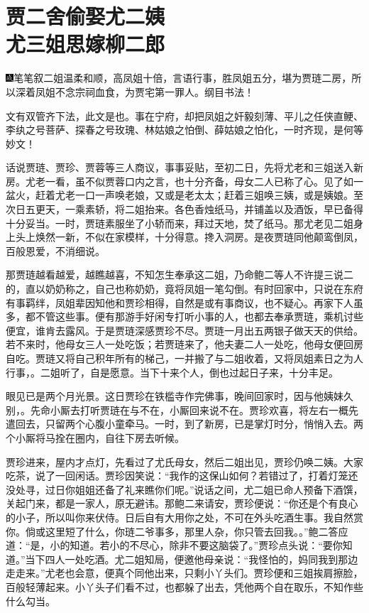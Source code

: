 
\chapter{贾二舍偷娶尤二姨\\尤三姐思嫁柳二郎}
{\includegraphics[width=3mm]{../Images/00005}\kaishu 笔笔叙二姐温柔和顺，高凤姐十倍，言语行事，胜凤姐五分，堪为贾琏二房，所以深着凤姐不念宗祠血食，为贾宅第一罪人。纲目书法！}

{\kaishu 文有双管齐下法，此文是也。事在宁府，却把凤姐之奸毅刻薄、平儿之任侠直鲠、李纨之号菩萨、探春之号玫瑰、林姑娘之怕倒、薛姑娘之怕化，一时齐现，是何等妙文！}

话说贾琏、贾珍、贾蓉等三人商议，事事妥贴，至初二日，先将尤老和三姐送入新房。尤老一看，虽不似贾蓉口内之言，也十分齐备，母女二人已称了心。见了如一盆火，赶着尤老一口一声唤老娘，又或是老太太；赶着三姐唤三姨，或是姨娘。至次日五更天，一乘素轿，将二姐抬来。各色香烛纸马，并铺盖以及酒饭，早已备得十分妥当。一时，贾琏素服坐了小轿而来，拜过天地，焚了纸马。那尤老见二姐身上头上焕然一新，不似在家模样，十分得意。搀入洞房。是夜贾琏同他颠鸾倒凤，百般恩爱，不消细说。

那贾琏越看越爱，越瞧越喜，不知怎生奉承这二姐，乃命鲍二等人不许提三说二的，直以奶奶称之，自己也称奶奶，竟将凤姐一笔勾倒。有时回家中，只说在东府有事羁绊，凤姐辈因知他和贾珍相得，自然是或有事商议，也不疑心。再家下人虽多，都不管这些事。便有那游手好闲专打听小事的人，也都去奉承贾琏，乘机讨些便宜，谁肯去露风。于是贾琏深感贾珍不尽。贾琏一月出五两银子做天天的供给。若不来时，他母女三人一处吃饭；若贾琏来了，他夫妻二人一处吃，他母女便回房自吃。贾琏又将自己积年所有的梯己，一并搬了与二姐收着，又将凤姐素日之为人行事，。二姐听了，自是愿意。当下十来个人，倒也过起日子来，十分丰足。

眼见已是两个月光景。这日贾珍在铁槛寺作完佛事，晚间回家时，因与他姨妹久别，。先命小厮去打听贾琏在与不在，小厮回来说不在。贾珍欢喜，将左右一概先遣回去，只留两个心腹小童牵马。一时，到了新房，已是掌灯时分，悄悄入去。两个小厮将马拴在圈内，自往下房去听候。

贾珍进来，屋内才点灯，先看过了尤氏母女，然后二姐出见，贾珍仍唤二姨。大家吃茶，说了一回闲话。贾珍因笑说：``我作的这保山如何？若错过了，打着灯笼还没处寻，过日你姐姐还备了礼来瞧你们呢。''说话之间，尤二姐已命人预备下酒馔，关起门来，都是一家人，原无避讳。那鲍二来请安，贾珍便说：``你还是个有良心的小子，所以叫你来伏侍。日后自有大用你之处，不可在外头吃酒生事。我自然赏你。倘或这里短了什么，你琏二爷事多，那里人杂，你只管去回我。。''鲍二答应道：``是，小的知道。若小的不尽心，除非不要这脑袋了。''贾珍点头说：``要你知道。''当下四人一处吃酒。尤二姐知局，便邀他母亲说：``我怪怕的，妈同我到那边走走来。''尤老也会意，便真个同他出来，只剩小丫头们。贾珍便和三姐挨肩擦脸，百般轻薄起来。小丫头子们看不过，也都躲了出去，凭他两个自在取乐，不知作些什么勾当。

